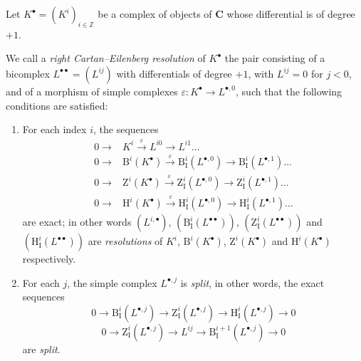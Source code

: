 \begin{env}[11.4.2]
\label{0.11.4.2}
Let $K^\bullet=(K^i)_{i\in\mathbb Z}$ be a complex of objects of $\boldsymbol{C}$
whose differential is of degree $+1$.

We call a \emph{right Cartan--Eilenberg resolution} of $K^\bullet$ the
pair consisting of a bicomplex $L^{\bullet\bullet}=(L^{ij})$ with
differentials of degree $+1$, with $L^{ij}=0$ for $j<0$, and of a morphism of
simple complexes $\varepsilon:K^\bullet\to L^{\bullet,0}$, such that the
following conditions are satisfied:
\begin{enumerate}
  \item[(i)] For each index $i$, the sequences
    \[
    \begin{aligned}
      0\longrightarrow{}&K^i\xrightarrow{\varepsilon}L^{i0}
        \longrightarrow L^{i1}\ldots\\
      0\longrightarrow{}&\mathrm B^i(K^\bullet)\xrightarrow{\varepsilon}
        \mathrm B_{\mathrm I}^i(L^{\bullet,0})
        \longrightarrow\mathrm B_{\mathrm I}^i(L^{\bullet,1})
        \ldots\\
      0\longrightarrow{}&\mathrm Z^i(K^\bullet)\xrightarrow{\varepsilon}
        \mathrm Z_{\mathrm I}^i(L^{\bullet,0})
        \longrightarrow\mathrm Z_{\mathrm I}^i(L^{\bullet,1})
        \ldots\\
      0\longrightarrow{}&\mathrm H^i(K^\bullet)\xrightarrow{\varepsilon}
        \mathrm H_{\mathrm I}^i(L^{\bullet,0})
        \longrightarrow\mathrm H_{\mathrm I}^i(L^{\bullet,1})
        \ldots
    \end{aligned}
    \]
    are exact; in other words $(L^{i,\bullet})$,
    $(\mathrm B_{\mathrm I}^i(L^{\bullet\bullet}))$,
    $(\mathrm Z_{\mathrm I}^i(L^{\bullet\bullet}))$ and
    $(\mathrm H_{\mathrm I}^i(L^{\bullet\bullet}))$ are
    \emph{resolutions} of $K^i$, $\mathrm B^i(K^\bullet)$,
    $\mathrm Z^i(K^\bullet)$ and $\mathrm H^i(K^\bullet)$ respectively.
  \item[(ii)] For each $j$, the simple complex $L^{\bullet,j}$ is
    \emph{split}, in other words, the exact sequences
    \[
      \label{0.11.4.2.1}
      0\longrightarrow\mathrm B_{\mathrm I}^i(L^{\bullet,j})
      \longrightarrow\mathrm Z_{\mathrm I}^i(L^{\bullet,j})
      \longrightarrow\mathrm H_{\mathrm I}^i(L^{\bullet,j})
      \longrightarrow0
      \tag{11.4.2.1}
    \]
    \[
      \label{0.11.4.2.2}
      0\longrightarrow\mathrm Z_{\mathrm I}^i(L^{\bullet,j})
      \longrightarrow L^{ij}
      \longrightarrow\mathrm B_{\mathrm I}^{i+1}(L^{\bullet,j})
      \longrightarrow0
      \tag{11.4.2.2}
    \]
    are \emph{split}.
\end{enumerate}


\end{env}
